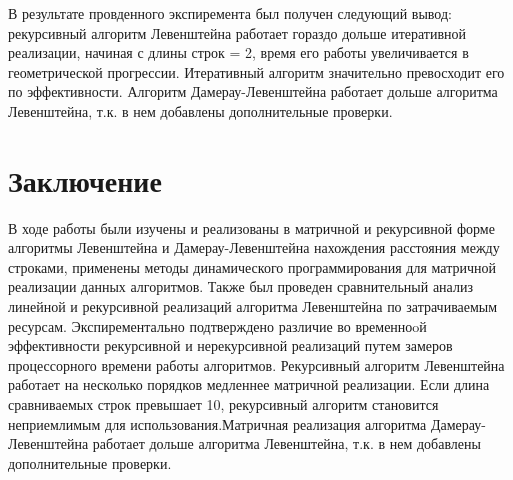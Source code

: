 \documentclass[a4paper, 14pt]{article}
\begin{document}
	
	\hspace{1cm} В результате провденного экспиремента был получен следующий вывод: рекурсивный алгоритм Левенштейна работает гораздо дольше итеративной реализации, начиная с длины строк = 2, время его работы увеличивается в геометрической прогрессии. Итеративный алгоритм значительно превосходит его по эффективности. Алгоритм Дамерау-Левенштейна работает дольше алгоритма Левенштейна, т.к. в нем добавлены дополнительные проверки.
	\newpage
	\section{Заключение}
	\hspace{1cm}В ходе работы были изучены и реализованы в матричной и рекурсивной форме алгоритмы Левенштейна и Дамерау-Левенштейна нахождения расстояния между строками, применены методы динамического программирования для матричной реализации данных алгоритмов. Также был проведен сравнительный анализ линейной и рекурсивной реализаций алгоритма Левенштейна по затрачиваемым ресурсам. Экспирементально подтверждено различие во временноoй эффективности рекурсивной и нерекурсивной реализаций путем замеров процессорного времени работы алгоритмов. Рекурсивный алгоритм Левенштейна работает на несколько порядков медленнее матричной реализации. Если длина сравниваемых строк превышает 10, рекурсивный алгоритм становится неприемлимым для использования.Матричная реализация алгоритма Дамерау-Левенштейна работает дольше алгоритма Левенштейна, т.к. в нем добавлены дополнительные проверки.
    
\end{document}
